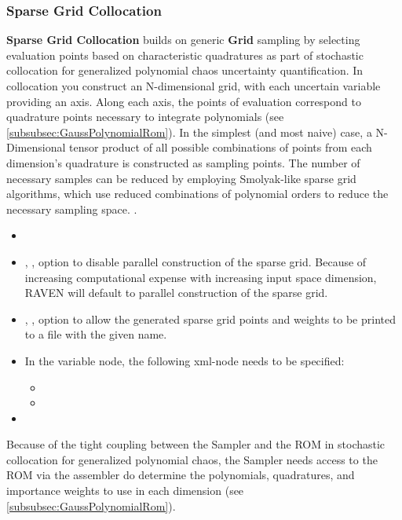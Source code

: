 \subsubsection{Sparse Grid Collocation}
\label{subsubsubsec:SparseGridCollocation}
\textbf{Sparse Grid Collocation} builds on generic \textbf{Grid} sampling by selecting evaluation points based on characteristic quadratures as part of
stochastic collocation for generalized polynomial chaos uncertainty quantification.  In collocation you construct an N-dimensional grid, with each uncertain
variable providing an axis.  Along each axis, the points of evaluation correspond to quadrature points necessary to integrate polynomials
(see \ref{subsubsec:GaussPolynomialRom}).  In the simplest (and most  naive) case, a N-Dimensional tensor product of all possible combinations of points from
each dimension's quadrature is constructed as sampling points.  The number of necessary samples can be reduced by employing Smolyak-like sparse grid algorithms,
which use reduced combinations of polynomial orders to reduce the necessary sampling space.  .

\begin{itemize}
\itemsep0em
\item \nameDescription
\item {}, , option to disable parallel construction of the sparse grid.  Because of increasing computational expense with increasing input space dimension, RAVEN will default to parallel construction of the sparse grid. %
\item {}, , option to allow the generated sparse grid points and weights to be printed to a file with the given name.
\end{itemize}
\begin{itemize}
\item \variableDescription
 In the variable node, the following xml-node needs to be specified:
 \begin{itemize}
    \item \distributionDescription
    \item \functionDescription
 \end{itemize}
 \item \constantVariablesDescription
\end{itemize}
Because of the tight coupling between the Sampler and the ROM in stochastic collocation for generalized polynomial chaos, the Sampler needs access to the ROM via the assembler do determine the polynomials, quadratures, and importance weights to use in each dimension (see \ref{subsubsec:GaussPolynomialRom}).

